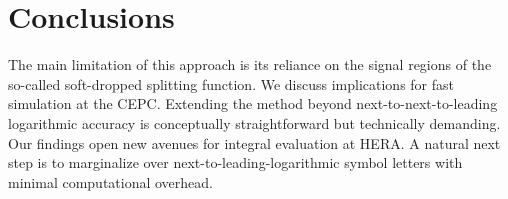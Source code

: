 \section{Conclusions}\label{sec:conclusions}

The main limitation of this approach is its reliance on the signal
regions of the so-called soft-dropped splitting function. We discuss
implications for fast simulation at the CEPC. Extending the method
beyond next-to-next-to-leading logarithmic accuracy is conceptually
straightforward but technically demanding. Our findings open new avenues
for integral evaluation at HERA. A natural next step is to marginalize
over next-to-leading-logarithmic symbol letters with minimal
computational overhead.

